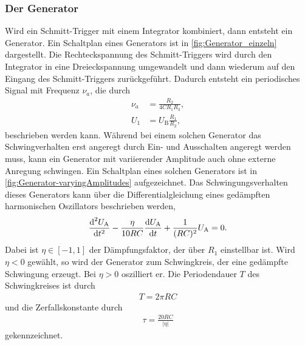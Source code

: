 \subsubsection{Der Generator}\label{subsubsec:Generator}                    %
Wird ein Schmitt-Trigger mit einem Integrator kombiniert, dann entsteht ein Generator.
Ein Schaltplan eines Generators ist in \autoref{fig:Generator_einzeln} dargestellt.
Die Rechteckspannung des Schmitt-Triggers wird durch den Integrator in eine Dreieckspannung umgewandelt und dann wiederum auf den Eingang des Schmitt-Triggers zurückgeführt.
Dadurch entsteht ein periodisches Signal mit Frequenz $\nu_a$, die durch 
\begin{align}
    \label{eq:generator}
    \nu_a &= \frac{R_2}{4CR_1R_3}\label{eq:FrequenzGenerator}, \\
    U_1 &= U_{\text{B}}\frac{R_1}{R_2}\label{eq:AmplitudeGenerator},
\end{align}
beschrieben werden kann.
Während bei einem solchen Generator das Schwingverhalten erst angeregt durch Ein- und Ausschalten angeregt werden muss, kann ein Generator mit variierender Amplitude auch ohne externe Anregung schwingen.
Ein Schaltplan eines solchen Generators ist in \autoref{fig:Generator-varyingAmplitudes} aufgezeichnet.
Das Schwingungsverhalten dieses Generators kann über die Differentialgleichung eines gedämpften harmonischen Oszillators beschrieben werden,
\begin{align}
    \label{eq:DGLGenerator}
    \frac{\text d^2U_\text{A}}{\text dt^2}-\frac{\eta}{10RC}\frac{\text dU_\text{A}}{\text dt}+\frac{1}{(RC)^2}U_\text{A}=0.
\end{align}
Dabei ist $\eta\in[-1,1]$ der Dämpfungsfaktor, der über $R_1$ einstellbar ist.
Wird $\eta<0$ gewählt, so wird der Generator zum Schwingkreis, der eine gedämpfte Schwingung erzeugt.
Bei $\eta>0$ oszilliert er.
Die Periodendauer $T$ des Schwingkreises ist durch
\begin{align}
    \label{eq:PeriodendauerGenerator}
    T=2\pi RC
\end{align}
und die Zerfallskonstante durch 
\begin{align}
    \tau=\frac{20RC}{|\eta|}
\end{align}
gekennzeichnet.
